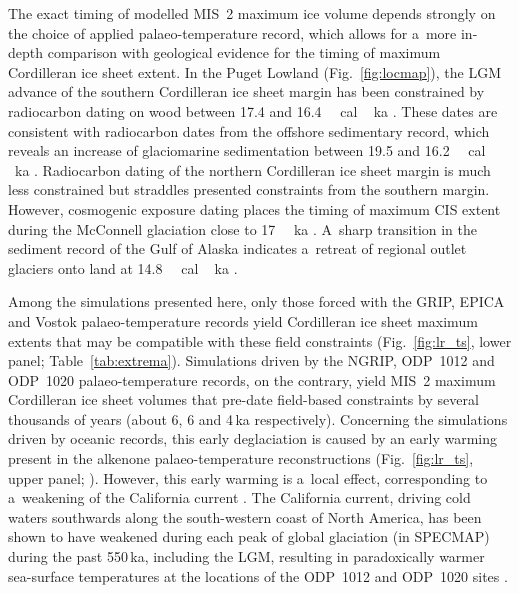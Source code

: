 \documentclass[tc, manuscript]{copernicus}
\begin{document}
      The exact timing of modelled MIS~2 maximum ice volume depends strongly
      on the choice of applied palaeo-temperature record, which allows for
      a~more in-depth comparison with geological evidence for the timing of
      maximum Cordilleran ice sheet extent. In the Puget Lowland
      (Fig.~\ref{fig:locmap}), the LGM advance of the southern Cordilleran
      ice sheet margin has been constrained by radiocarbon dating on wood
      between 17.4 and 16.4\,\unit{\,cal\,ka}
      \citep{Porter.Swanson.1998}. These dates are consistent with
      radiocarbon dates from the offshore sedimentary record, which reveals
      an increase of glaciomarine sedimentation between 19.5 and
      16.2\,\unit{\,cal\,ka} \citep{Cosma.etal.2008,
      Taylor.etal.2014}. Radiocarbon dating of the northern Cordilleran ice
      sheet margin is much less constrained but straddles presented
      constraints from the southern margin. However, cosmogenic exposure
      dating places the timing of maximum CIS extent during the McConnell
      glaciation close to 17\,\unit{\,ka}
      \citep{Stroeven.etal.2010, Stroeven.etal.2014}. A~sharp transition in
      the sediment record of the Gulf of Alaska indicates a~retreat of
      regional outlet glaciers onto land at
      14.8\,\unit{\,cal\,ka} \citep{Davies.etal.2011}.

      Among the simulations presented here, only those forced with the GRIP,
      EPICA and Vostok palaeo-temperature records yield Cordilleran ice
      sheet maximum extents that may be compatible with these field
      constraints (Fig.~\ref{fig:lr_ts}, lower panel;
      Table~\ref{tab:extrema}). Simulations driven by the NGRIP, ODP~1012
      and ODP~1020 palaeo-temperature records, on the contrary, yield MIS~2
      maximum Cordilleran ice sheet volumes that pre-date field-based
      constraints by several thousands of years (about 6, 6 and 4\,\unit{ka}
      respectively). Concerning the simulations driven by oceanic records,
      this early deglaciation is caused by an early warming present in the
      alkenone palaeo-temperature reconstructions (Fig.~\ref{fig:lr_ts},
      upper panel; \citealp[Fig.~3]{Herbert.etal.2001}). However, this early
      warming is a~local effect, corresponding to a~weakening of the
      California current \citep{Herbert.etal.2001}. The California current,
      driving cold waters southwards along the south-western coast of North
      America, has been shown to have weakened during each peak of global
      glaciation (in SPECMAP) during the past 550\,\unit{ka}, including the
      LGM, resulting in paradoxically warmer sea-surface temperatures at the
      locations of the ODP~1012 and ODP~1020 sites
      \citep{Herbert.etal.2001}.
\end{document}
